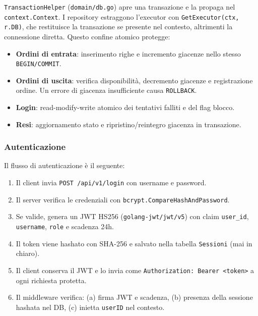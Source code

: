 \documentclass[a4paper,12pt]{article}
\begin{document}
\texttt{TransactionHelper} (\texttt{domain/db.go}) apre una transazione e la propaga nel \texttt{context.Context}. I repository estraggono l'executor con \texttt{GetExecutor(ctx, r.DB)}, che restituisce la transazione se presente nel contesto, altrimenti la connessione diretta. Questo confine atomico protegge:

\begin{itemize}
    \item \textbf{Ordini di entrata}: inserimento righe e incremento giacenze nello stesso \texttt{BEGIN/COMMIT}.
    \item \textbf{Ordini di uscita}: verifica disponibilità, decremento giacenze e registrazione ordine. Un errore di giacenza insufficiente causa \texttt{ROLLBACK}.
    \item \textbf{Login}: read-modify-write atomico dei tentativi falliti e del flag blocco.
    \item \textbf{Resi}: aggiornamento stato e ripristino/reintegro giacenza in transazione.
\end{itemize}


\subsubsection{Autenticazione}

Il flusso di autenticazione è il seguente:

\begin{enumerate}
    \item Il client invia \texttt{POST /api/v1/login} con username e password.
    \item Il server verifica le credenziali con \texttt{bcrypt.CompareHashAndPassword}.
    \item Se valide, genera un JWT HS256 (\texttt{golang-jwt/jwt/v5}) con claim \texttt{user\_id}, \texttt{username}, \texttt{role} e scadenza 24h.
    \item Il token viene hashato con SHA-256 e salvato nella tabella \texttt{Sessioni} (mai in chiaro).
    \item Il client conserva il JWT e lo invia come \texttt{Authorization: Bearer <token>} a ogni richiesta protetta.
    \item Il middleware verifica: (a) firma JWT e scadenza, (b) presenza della sessione hashata nel DB, (c) inietta \texttt{userID} nel contesto.
\end{enumerate}
\end{document}
